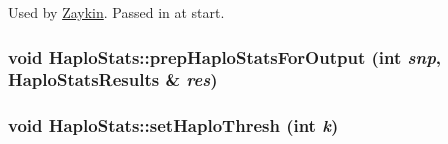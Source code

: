Used by \hyperlink{classZaykin}{Zaykin}. Passed in at start. 

\hypertarget{classHaploStats_a2e17c8ccd68b20b4a2cb20e91025c13e}{
\subsubsection[{prepHaploStatsForOutput}]{\setlength{\rightskip}{0pt plus 5cm}void HaploStats::prepHaploStatsForOutput (int {\em snp}, \/  {\bf HaploStatsResults} \& {\em res})}}
\label{classHaploStats_a2e17c8ccd68b20b4a2cb20e91025c13e}
\hypertarget{classHaploStats_a5f5c2445d79a7913381ff0ac5d8f53d4}{
\subsubsection[{setHaploThresh}]{\setlength{\rightskip}{0pt plus 5cm}void HaploStats::setHaploThresh (int {\em k})}}
\label{classHaploStats_a5f5c2445d79a7913381ff0ac5d8f53d4}


